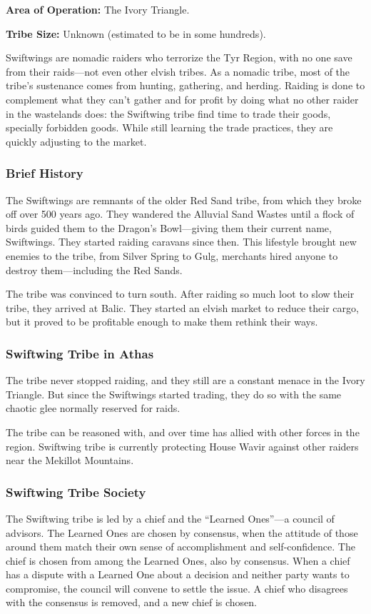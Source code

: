 \textbf{Area of Operation:} The Ivory Triangle.

\textbf{Tribe Size:} Unknown (estimated to be in some hundreds).

Swiftwings are nomadic raiders who terrorize the Tyr Region, with no one save from their raids---not even other elvish tribes. As a nomadic tribe, most of the tribe's sustenance comes from hunting, gathering, and herding. Raiding is done to complement what they can't gather and for profit by doing what no other raider in the wastelands does: the Swiftwing tribe find time to trade their goods, specially forbidden goods. While still learning the trade practices, they are quickly adjusting to the market.

\subsubsection{Brief History}
The Swiftwings are remnants of the older Red Sand tribe, from which they broke off over 500 years ago. They wandered the Alluvial Sand Wastes until a flock of birds guided them to the Dragon's Bowl---giving them their current name, Swiftwings. They started raiding caravans since then. This lifestyle brought new enemies to the tribe, from Silver Spring to Gulg, merchants hired anyone to destroy them---including the Red Sands.

The tribe was convinced to turn south. After raiding so much loot to slow their tribe, they arrived at Balic. They started an elvish market to reduce their cargo, but it proved to be profitable enough to make them rethink their ways.

\subsubsection{Swiftwing Tribe in Athas}
The tribe never stopped raiding, and they still are a constant menace in the Ivory Triangle. But since the Swiftwings started trading, they do so with the same chaotic glee normally reserved for raids.

The tribe can be reasoned with, and over time has allied with other forces in the region. Swiftwing tribe is currently protecting House Wavir against other raiders near the Mekillot Mountains.

\subsubsection{Swiftwing Tribe Society}
The Swiftwing tribe is led by a chief and the ``Learned Ones''---a council of advisors. The Learned Ones are chosen by consensus, when the attitude of those around them match their own sense of accomplishment and self-confidence. The chief is chosen from among the Learned Ones, also by consensus. When a chief has a dispute with a Learned One about a decision and neither party wants to compromise, the council will convene to settle the issue. A chief who disagrees with the consensus is removed, and a new chief is chosen.

